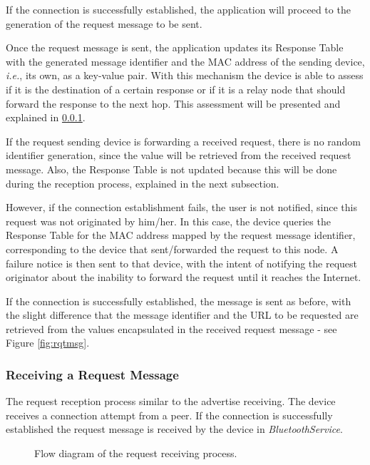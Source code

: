 If the connection is successfully established, the application will proceed to the generation of the request message to be sent.

Once the request message is sent, the application updates its Response Table with the generated message identifier and the \gls{MAC} address of the sending device, \textit{i.e.}, its own, as a key-value pair. With this mechanism the device is able to assess if it is the destination of a certain response or if it is a relay node that should forward the response to the next hop. This assessment will be presented and explained in \ref{subsubsec:rcvrqt}.

If the request sending device is forwarding a received request, there is no random identifier generation, since the value will be retrieved from the received request message. Also, the Response Table is not updated because this will be done during the reception process, explained in the next subsection.

However, if the connection establishment fails, the user is not notified, since this request was not originated by him/her. In this case, the device queries the Response Table for the \gls{MAC} address mapped by the request message identifier, corresponding to the device that sent/forwarded the request to this node. A failure notice is then sent to that device, with the intent of notifying the request originator about the inability to forward the request until it reaches the Internet.

If the connection is successfully established, the message is sent as before, with the slight difference that the message identifier and the \gls{URL} to be requested are retrieved from the values encapsulated in the received request message - see Figure \ref{fig:rqtmsg}.

\subsubsection{Receiving a Request Message}
\label{subsubsec:rcvrqt}

The request reception process similar to the advertise receiving. The device receives a connection attempt from a peer. If the connection is successfully established the request message is received by the device in \textit{BluetoothService}.


\begin{figure}[ht]
	\noindent{}
	\caption{\label{fig:rqtrcvflux} Flow diagram of the request receiving process.}
\end{figure}

